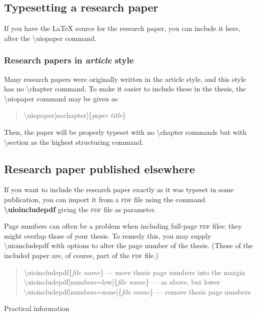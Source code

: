 \documentclass[UKenglish]{uiophdthesis}
\newcommand{\bsl}{\textbackslash}
\newcommand{\p}[1]{\textsf{#1}}
\newcommand{\pcmd}[1]{\p{\bsl #1}}
\newcommand{\ppar}[1]{\p{\{#1\}}}
\begin{document}
\subsection{Typesetting a research paper}
If you have the \LaTeX{} source for the research paper, you can include it
here, after the \pcmd{uiopaper} command.

\subsubsection{Research papers in \emph{article} style}
Many research papers were originally written in the \p{article} style,
and this style has no \pcmd{chapter} command. To make it easier to include
these in the thesis, the \pcmd{uiopaper} command may be given as
\begin{quote}
  \p{\pcmd{uiopaper}[nochapter]\ppar{\emph{paper title}}}
\end{quote}
Then, the paper will be properly typeset with no \pcmd{chapter}
commands but with \pcmd{section} as the highest structuring command.

\subsection{Research paper published elsewhere}
If you want to include the research paper exactly as it was typeset in
some publication, you can import it from a \textsc{pdf} file using the
command \textbf{\pcmd{uioincludepdf}} giving the \textsc{pdf} file as
parameter.

Page numbers can often be a problem when including full-page
\textsc{pdf} files: they might overlap those of your thesis. To remedy
this, you may supply \pcmd{uioincludepdf} with options to alter the
page number of the thesis. (Those of the included paper are, of
course, part of the \textsc{pdf} file.)

\begin{quote}
  \p{\pcmd{uioincludepdf}\ppar{\emph{file name}}} --- move thesis
  page numbers into the margin\\
  \p{\pcmd{uioincludepdf}[numbers=low]\ppar{\emph{file name}}} --- as
  above, but lower\\
  \p{\pcmd{uioincludepdf}[numbers=none]\ppar{\emph{file name}}} ---
  remove thesis page numbers
\end{quote}

\begin{uioseparatorpage}{Practical information\label{info-part}}
\end{uioseparatorpage}
  
\end{document}
